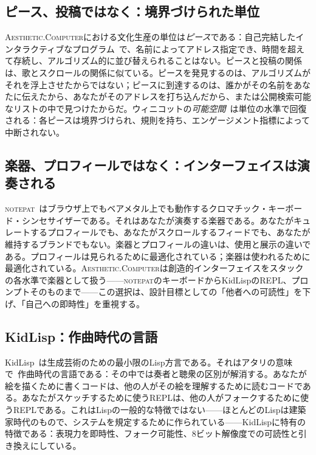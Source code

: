 \documentclass[10pt,letterpaper,twocolumn]{article}
\newcommand{\ac}{\textsc{Aesthetic.Computer}}
\newcommand{\np}{\textsc{notepat}}
\begin{document}
\subsection{ピース、投稿ではなく：境界づけられた単位}

\ac{}における文化生産の単位は\emph{ピース}である：自己完結したインタラクティブなプログラム~\citep{scudder2026pieces}で、名前によってアドレス指定でき、時間を超えて存続し、アルゴリズム的に並び替えられることはない。ピースと投稿の関係は、歌とスクロールの関係に似ている。ピースを発見するのは、アルゴリズムがそれを浮上させたからではない；ピースに到達するのは、誰かがその名前をあなたに伝えたから、あなたがそのアドレスを打ち込んだから、または公開検索可能なリストの中で見つけたからだ。ウィニコットの\emph{可能空間}~\citep{winnicott1971playing}は単位の水準で回復される：各ピースは境界づけられ、規則を持ち、エンゲージメント指標によって中断されない。

\subsection{楽器、プロフィールではなく：インターフェイスは演奏される}

\np{}~\citep{scudder2026notepat}はブラウザ上でもベアメタル上でも動作するクロマチック・キーボード・シンセサイザーである。それはあなたが演奏する楽器である。あなたがキュレートするプロフィールでも、あなたがスクロールするフィードでも、あなたが維持するブランドでもない。楽器とプロフィールの違いは、使用と展示の違いである。プロフィールは見られるために最適化されている；楽器は使われるために最適化されている。\ac{}は創造的インターフェイスをスタックの各水準で楽器として扱う——\np{}のキーボードからKidLispのREPL、プロンプトそのものまで——この選択は、設計目標としての「他者への可読性」を下げ、「自己への即時性」を重視する。

\subsection{KidLisp：作曲時代の言語}

KidLisp~\citep{scudder2026kidlisp}は生成芸術のための最小限のLisp方言である。それはアタリの意味で~\citep{attali1985noise}作曲時代の言語である：その中では奏者と聴衆の区別が解消する。あなたが絵を描くために書くコードは、他の人がその絵を理解するために読むコードである。あなたがスケッチするために使うREPLは、他の人がフォークするために使うREPLである。これはLispの一般的な特徴ではない——ほとんどのLispは建築家時代のもので、システムを規定するために作られている——KidLispに特有の特徴である：表現力を即時性、フォーク可能性、8ビット解像度での可読性と引き換えにしている。
\end{document}
